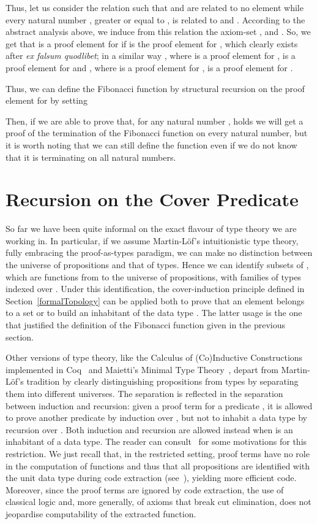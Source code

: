 \documentclass[copyright,creativecommons]{eptcs}
\begin{document}
Thus, let us consider the relation  such that  and  are related to no element
while every natural number , greater or equal to , is related to  and .
According to the abstract analysis above, we induce from this relation the axiom-set 
,  and 
.
So, we get that  is a proof element for 
if  is the proof element for ,
which clearly exists after {\em ex falsum quodlibet}; in a similar way , where  is a 
proof element for , is a proof 
element for   and , where  is a 
proof element for , is a proof 
element for  .

Thus, we can define the Fibonacci function by structural recursion on the proof element for 
 by setting


Then, if we are able to prove that, for any natural number , 
 holds
we will get a proof of the termination of the Fibonacci function on every natural number,
but it is worth noting that we can still define the function even if we do not know that it is
terminating on all natural numbers.


\section{Recursion on the Cover Predicate}
\label{recursion}
So far we have been quite informal on the exact flavour of type theory we
are working in. In particular, if we assume Martin-L\"of's intuitionistic type 
theory, fully embracing the proof-as-types paradigm, we can make no
distinction between the universe of propositions and that of types. Hence
we can identify subsets of , which are functions from  to the universe
 of propositions, with families of types indexed over .
Under this identification, the cover-induction principle defined in
Section~\ref{formalTopology} can be applied both to prove that an element
 belongs to a set  or to build an inhabitant of the data type .
The latter usage is the one that justified the definition of the Fibonacci
function given in the previous section.

Other versions of type theory, like the Calculus of (Co)Inductive
Constructions implemented in Coq~\cite{Coq8.2} and Maietti's Minimal Type
Theory~\cite{Mai09}, depart from Martin-L\"of's tradition by clearly
distinguishing propositions from types by separating them into different
universes.
The separation is reflected in the separation between induction and recursion:
given a proof term  for a predicate , it is allowed to prove another
predicate  by induction over , but not to inhabit a data type by recursion
over . Both induction and recursion are allowed instead when  is an
inhabitant of a data type. The reader can consult~\cite{Mai09} for some
motivations for this restriction. We just recall that, in the restricted
setting, proof terms have no role in the computation of functions and thus
that all propositions are identified with the unit data type during code
extraction (see~\cite{Let08}), yielding more efficient code. Moreover, since
the proof terms are ignored by code extraction, the use of classical logic and,
more generally, of axioms that break cut elimination, does not jeopardise
computability of the extracted function.
\end{document}
